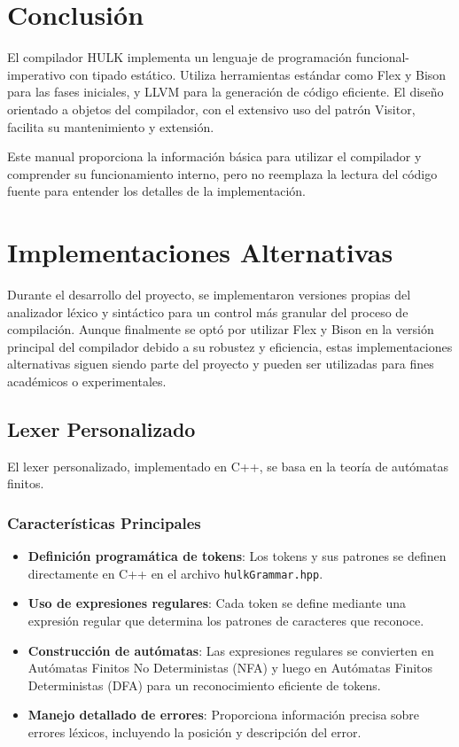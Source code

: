 \documentclass{article}
\begin{document}
\section{Conclusión}

El compilador HULK implementa un lenguaje de programación funcional-imperativo con tipado estático. Utiliza herramientas estándar como Flex y Bison para las fases iniciales, y LLVM para la generación de código eficiente. El diseño orientado a objetos del compilador, con el extensivo uso del patrón Visitor, facilita su mantenimiento y extensión.

Este manual proporciona la información básica para utilizar el compilador y comprender su funcionamiento interno, pero no reemplaza la lectura del código fuente para entender los detalles de la implementación.

\section{Implementaciones Alternativas}

Durante el desarrollo del proyecto, se implementaron versiones propias del analizador léxico y sintáctico para un control más granular del proceso de compilación. Aunque finalmente se optó por utilizar Flex y Bison en la versión principal del compilador debido a su robustez y eficiencia, estas implementaciones alternativas siguen siendo parte del proyecto y pueden ser utilizadas para fines académicos o experimentales.

\subsection{Lexer Personalizado}

El lexer personalizado, implementado en C++, se basa en la teoría de autómatas finitos. 

\subsubsection{Características Principales}
\begin{itemize}
    \item \textbf{Definición programática de tokens}: Los tokens y sus patrones se definen directamente en C++ en el archivo \texttt{hulkGrammar.hpp}.
    \item \textbf{Uso de expresiones regulares}: Cada token se define mediante una expresión regular que determina los patrones de caracteres que reconoce.
    \item \textbf{Construcción de autómatas}: Las expresiones regulares se convierten en Autómatas Finitos No Deterministas (NFA) y luego en Autómatas Finitos Deterministas (DFA) para un reconocimiento eficiente de tokens.
    \item \textbf{Manejo detallado de errores}: Proporciona información precisa sobre errores léxicos, incluyendo la posición y descripción del error.
\end{itemize}
\end{document}
